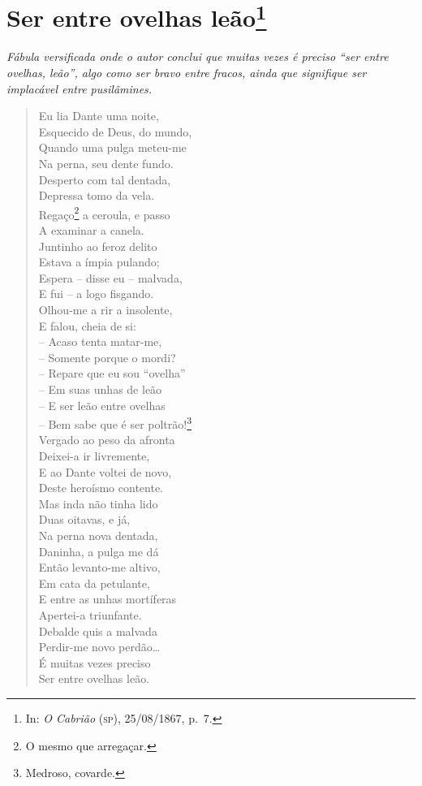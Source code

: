 \chapter{Ser entre ovelhas leão\footnote{In: 
\emph{O Cabrião} (\textsc{sp}), 25/08/1867, p.~7.}}

\begin{didascalia}
\emph{Fábula versificada onde o autor conclui que muitas vezes é preciso
``ser entre ovelhas, leão'', algo como ser bravo entre fracos, ainda que
signifique ser implacável entre pusilâmines.}
\end{didascalia}


\begin{verse}
Eu lia Dante uma noite,\\
Esquecido de Deus, do mundo,\\
Quando uma pulga meteu-me\\
Na perna, seu dente fundo.\\
Desperto com tal dentada,\\
Depressa tomo da vela.\\
Regaço\footnote{ O mesmo que arregaçar.} a ceroula, e passo\\
A examinar a canela.\\
Juntinho ao feroz delito\\
Estava a ímpia pulando;\\
Espera -- disse eu -- malvada,\\
E fui -- a logo fisgando.\\
Olhou-me a rir a insolente,\\
E falou, cheia de si:\\
-- Acaso tenta matar-me,\\
-- Somente porque o mordi?\\
-- Repare que eu sou ``ovelha''\\
-- Em suas unhas de leão\\
-- E ser leão entre ovelhas\\
-- Bem sabe que é ser poltrão!\footnote{ Medroso, covarde.}\\
Vergado ao peso da afronta\\
Deixei-a ir livremente,\\
E ao Dante voltei de novo,\\
Deste heroísmo contente.\\
Mas inda não tinha lido\\
Duas oitavas, e já,\\
Na perna nova dentada,\\
Daninha, a pulga me dá\\
Então levanto-me altivo,\\
Em cata da petulante,\\
E entre as unhas mortíferas\\
Apertei-a triunfante.\\
Debalde quis a malvada\\
Perdir-me novo perdão\ldots{}\\
É muitas vezes preciso\\
Ser entre ovelhas leão.
\end{verse}

